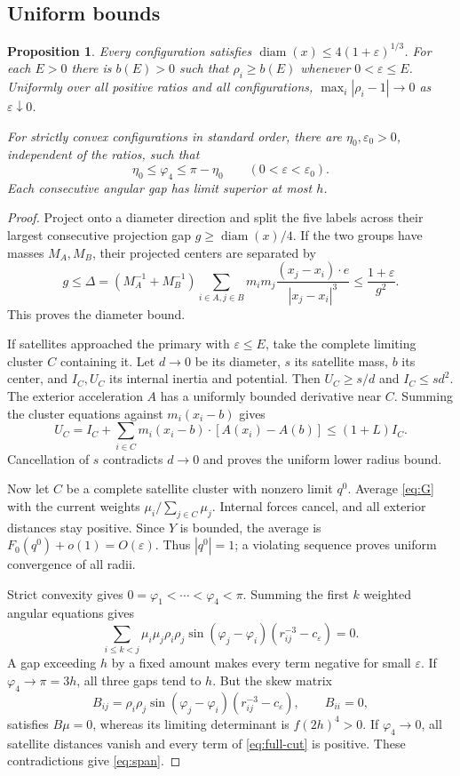 \documentclass[11pt,a4paper]{article}
\numberwithin{equation}{section}
\newtheorem{proposition}[theorem]{Proposition}
\theoremstyle{remark}
\newcommand{\eps}{\varepsilon}
\DeclareMathOperator{\diam}{diam}
\begin{document}
\subsection{Uniform bounds}
\begin{proposition}\label{prop:uniform}
Every configuration satisfies $\diam(x)\le4(1+\eps)^{1/3}$. For each $E>0$ there is $b(E)>0$ such that $\rho_i\ge b(E)$ whenever $0<\eps\le E$. Uniformly over all positive ratios and all configurations, $\max_i|\rho_i-1|\to0$ as $\eps\downarrow0$.

For strictly convex configurations in standard order, there are $\eta_0,\eps_0>0$, independent of the ratios, such that
\begin{equation}\label{eq:span}
 \eta_0\le\varphi_4\le\pi-\eta_0\qquad(0<\eps<\eps_0).
\end{equation}
Each consecutive angular gap has limit superior at most $h$.
\end{proposition}
\begin{proof}
Project onto a diameter direction and split the five labels across their largest consecutive projection gap $g\ge\diam(x)/4$. If the two groups have masses $M_A,M_B$, their projected centers are separated by
\[
 g\le\Delta=\left(M_A^{-1}+M_B^{-1}\right)
 \sum_{i\in A,j\in B}m_im_j\frac{(x_j-x_i)\cdot e}{|x_j-x_i|^3}
 \le\frac{1+\eps}{g^2}.
\]
This proves the diameter bound.

If satellites approached the primary with $\eps\le E$, take the complete limiting cluster $C$ containing it. Let $d\to0$ be its diameter, $s$ its satellite mass, $b$ its center, and $I_C,U_C$ its internal inertia and potential. Then $U_C\ge s/d$ and $I_C\le sd^2$. The exterior acceleration $A$ has a uniformly bounded derivative near $C$. Summing the cluster equations against $m_i(x_i-b)$ gives
\[
 U_C=I_C+\sum_{i\in C}m_i(x_i-b)\cdot[A(x_i)-A(b)]\le(1+L)I_C.
\]
Cancellation of $s$ contradicts $d\to0$ and proves the uniform lower radius bound.

Now let $C$ be a complete satellite cluster with nonzero limit $q^0$. Average \eqref{eq:G} with the current weights $\mu_i/\sum_{j\in C}\mu_j$. Internal forces cancel, and all exterior distances stay positive. Since $Y$ is bounded, the average is $F_0(q^0)+o(1)=O(\eps)$. Thus $|q^0|=1$; a violating sequence proves uniform convergence of all radii.

Strict convexity gives $0=\varphi_1<\cdots<\varphi_4<\pi$. Summing the first $k$ weighted angular equations gives
\begin{equation}\label{eq:full-cut}
 \sum_{i\le k<j}\mu_i\mu_j\rho_i\rho_j\sin(\varphi_j-\varphi_i)(r_{ij}^{-3}-c_\eps)=0.
\end{equation}
A gap exceeding $h$ by a fixed amount makes every term negative for small $\eps$. If $\varphi_4\to\pi=3h$, all three gaps tend to $h$. But the skew matrix
\[
 B_{ij}=\rho_i\rho_j\sin(\varphi_j-\varphi_i)(r_{ij}^{-3}-c_\eps),\qquad B_{ii}=0,
\]
satisfies $B\mu=0$, whereas its limiting determinant is $f(2h)^4>0$. If $\varphi_4\to0$, all satellite distances vanish and every term of \eqref{eq:full-cut} is positive. These contradictions give \eqref{eq:span}.
\end{proof}
\end{document}
